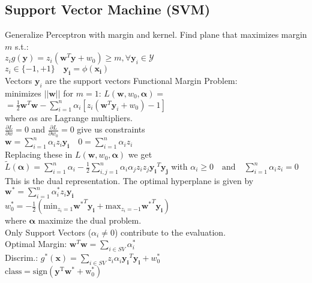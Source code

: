 \subsection*{Support Vector Machine (SVM)}
Generalize Perceptron with margin and kernel.
Find plane that maximizes margin $m$ s.t.:\\
$z_ig(\mathbf{y})=z_i(\mathbf{w}^T\mathbf{y}+w_0)\geq m,\forall \mathbf{y}_i \in \mathcal{Y}$\\
$z_i \in \{-1,+1\}\quad \mathbf{y_i} = \phi(\mathbf{x_i})$\\
Vectors $\mathbf{y}_i$ are the support vectors
Functional Margin Problem:\\
minimizes $||\mathbf{w}||$ for $m{=}1$: 
$L(\mathbf{w}, w_0, \mathbf{\alpha}) {=}$\\
$=\frac{1}{2}\mathbf{w}^T\mathbf{w}{-}\sum_{i=1}^n\alpha_i[z_i(\mathbf{w}^T\mathbf{y}_i{}+w_0){-}1]$\\
where $\alpha$s are Lagrange multipliers.\\
$\frac{\partial L}{\partial w} {=} 0$ and $\frac{\partial L}{\partial w_0} {=} 0$ give us constraints\\
$\mathbf{w}=\sum_{i=1}^n\alpha_iz_i\mathbf{y_i} \quad 0=\sum_{i=1}^n\alpha_iz_i$\\
Replacing these in $L(\mathbf{w}, w_0, \mathbf{\alpha})$ we get\\
$\tilde{L}(\mathbf{\alpha}){=}\sum_{i=1}^n\alpha_i{-}\frac{1}{2}\sum_{i,j=1}^n\alpha_i\alpha_jz_iz_j\mathbf{y_i}^T\mathbf{y_j}$
with $\alpha_i\geq0\quad\mathrm{and}\quad\sum_{i=1}^n\alpha_iz_i=0$\\
This is the dual representation.
The optimal hyperplane is given by\\
$\mathbf{w^*}=\sum_{i=1}^n\alpha_i^*z_i\mathbf{y_i}$\\
$ w_0^*{=}{-}\frac{1}{2}(\mathrm{min}_{z_i=1}\mathbf{w^*}^T\mathbf{y_i}{+}\mathrm{max}_{z_i=-1}\mathbf{w^*}^T\mathbf{y_i})$\\
where $\mathbf{\alpha}$ maximize the dual problem.\\
Only Support Vectors ($\alpha_i\not=0$) contribute to the evaluation.\\
Optimal Margin: $\mathbf{w}^T\mathbf{w}=\sum_{i\in SV}\alpha_i^*$\\
Discrim.: $g^*(\mathbf{x}){=}\sum_{i\in SV}z_i\alpha_i\mathbf{y_i}^T\mathbf{y_i}{+}w^*_0$\\
$\mathrm{class} = \mathrm{sign(\mathbf{y}^T\mathbf{w}^*+w_0^*)}$

